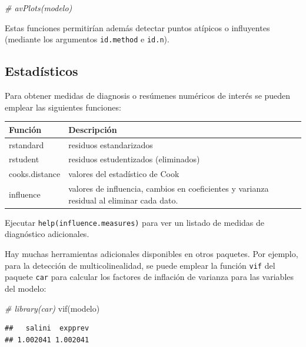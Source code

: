 \documentclass[
]{book}
\newenvironment{Shaded}{\begin{snugshade}}{\end{snugshade}}
\newcommand{\CommentTok}[1]{\textcolor[rgb]{0.56,0.35,0.01}{\textit{#1}}}
\newcommand{\FunctionTok}[1]{\textcolor[rgb]{0.00,0.00,0.00}{#1}}
\newcommand{\NormalTok}[1]{#1}
\theoremstyle{break}
\begin{document}
\begin{Shaded}
\begin{Highlighting}[]
\CommentTok{\# avPlots(modelo)}
\end{Highlighting}
\end{Shaded}

Estas funciones permitirían además detectar puntos atípicos o influyentes
(mediante los argumentos \texttt{id.method} e \texttt{id.n}).

\hypertarget{estaduxedsticos}{%
\subsection{Estadísticos}\label{estaduxedsticos}}

Para obtener medidas de diagnosis o resúmenes numéricos de interés se pueden emplear
las siguientes funciones:

\begin{longtable}[]{@{}
  >{\raggedright\arraybackslash}p{}
  >{\raggedright\arraybackslash}p{}@{}}
\toprule
Función & Descripción \\
\midrule
\endhead
rstandard & residuos estandarizados \\
rstudent & residuos estudentizados (eliminados) \\
cooks.distance & valores del estadístico de Cook \\
influence & valores de influencia, cambios en coeficientes y varianza residual al eliminar cada dato. \\
\bottomrule
\end{longtable}

Ejecutar \texttt{help(influence.measures)} para ver un listado de medidas de diagnóstico adicionales.

Hay muchas herramientas adicionales disponibles en otros paquetes.
Por ejemplo, para la detección de multicolinealidad, se puede emplear la función
\texttt{vif} del paquete \texttt{car} para calcular los factores de inflación de varianza para
las variables del modelo:

\begin{Shaded}
\begin{Highlighting}[]
\CommentTok{\# library(car)}
\FunctionTok{vif}\NormalTok{(modelo)}
\end{Highlighting}
\end{Shaded}

\begin{verbatim}
##   salini  expprev 
## 1.002041 1.002041
\end{verbatim}
\end{document}

